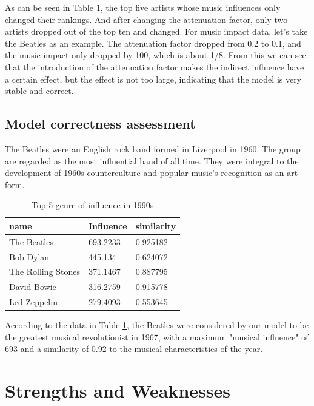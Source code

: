 \documentclass[12pt]{article}  %
\begin{document}
As can be seen in Table \ref{tab:judge}, the top five artists whose music influences only changed their rankings. And after changing the attenuation factor, only two artists dropped out of the top ten and changed. For music impact data, let's take the Beatles as an example. The attenuation factor dropped from 0.2 to 0.1, and the music impact only dropped by 100, which is about 1/8. From this we can see that the introduction of the attenuation factor makes the indirect influence have a certain effect, but the effect is not too large, indicating that the model is very stable and correct. 



\subsection{Model correctness assessment }

The Beatles were an English rock band formed in Liverpool in 1960. The group are regarded as the most influential band of all time. They were integral to the development of 1960s counterculture and popular music's recognition as an art form.\cite{noauthor_beatles_nodate1}

\begin{table}[htbp]
\centering
\caption{Top 5 genre of influence in 1990s}\label{tab:judge}
\begin{tabular}{lll}
\hline\hline
name               & Influence  & similarity \\ 
\hline
The Beatles        & 693.2233   & 0.925182   \\ 
Bob Dylan          & 445.134    & 0.624072   \\
The Rolling Stones & 371.1467  & 0.887795   \\
David Bowie        & 316.2759  & 0.915778   \\
Led Zeppelin       & 279.4093  & 0.553645  \\
\hline\hline
\end{tabular}
\end{table}

According to the data in Table \ref{tab:judge}, the Beatles were considered by our model to be the greatest musical revolutionist in 1967, with a maximum "musical influence" of 693 and a similarity of 0.92 to the musical characteristics of the year.
\section{Strengths and Weaknesses}
\end{document}
